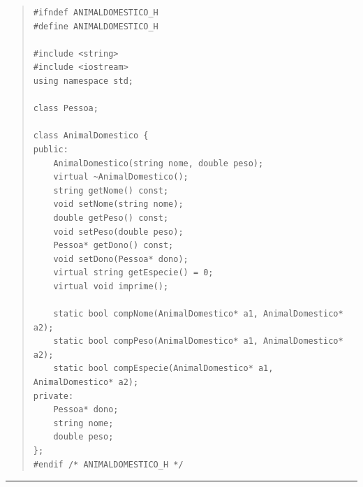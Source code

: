 \documentclass[12pt]{article}
\begin{document}
\begin{quote}
\begin{scriptsize}
\begin{verbatim}
#ifndef ANIMALDOMESTICO_H
#define ANIMALDOMESTICO_H

#include <string>
#include <iostream>
using namespace std;

class Pessoa;

class AnimalDomestico {
public:
    AnimalDomestico(string nome, double peso);
    virtual ~AnimalDomestico();
    string getNome() const;
    void setNome(string nome);
    double getPeso() const;
    void setPeso(double peso);
    Pessoa* getDono() const;
    void setDono(Pessoa* dono);
    virtual string getEspecie() = 0;
    virtual void imprime();
    
    static bool compNome(AnimalDomestico* a1, AnimalDomestico* a2);
    static bool compPeso(AnimalDomestico* a1, AnimalDomestico* a2);
    static bool compEspecie(AnimalDomestico* a1, AnimalDomestico* a2);
private:
    Pessoa* dono;
    string nome;
    double peso;
};
#endif /* ANIMALDOMESTICO_H */
\end{verbatim}
\end{scriptsize}
\end{quote}

\par\noindent\rule{\textwidth}{0.4pt}
\end{document}
